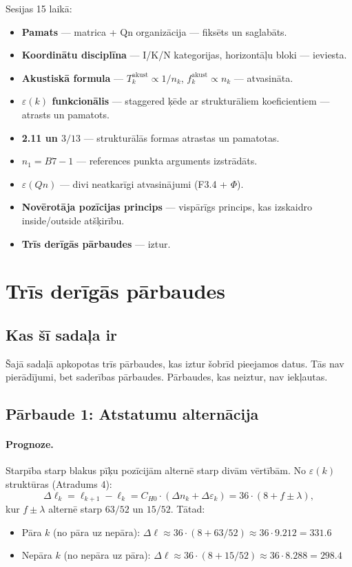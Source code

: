\documentclass[12pt,a4paper]{article}
\begin{document}
Sesijas 15 laikā:
\begin{itemize}
    \item \textbf{Pamats} — matrica + Qn organizācija — fiksēts un saglabāts.
    \item \textbf{Koordinātu disciplīna} — I/K/N kategorijas, horizontāļu bloki — ieviesta.
    \item \textbf{Akustiskā formula} — $T_k^{\text{akust}} \propto 1/n_k$, $f_k^{\text{akust}} \propto n_k$ — atvasināta.
    \item \textbf{$\varepsilon(k)$ funkcionālis} — staggered ķēde ar strukturāliem koeficientiem — atrasts un pamatots.
    \item \textbf{2.11 un $3/13$} — strukturālās formas atrastas un pamatotas.
    \item \textbf{$n_1 = B7-1$} — references punkta arguments izstrādāts.
    \item \textbf{$\varepsilon(Qn)$} — divi neatkarīgi atvasinājumi (F3.4 + $\Phi$).
    \item \textbf{Novērotāja pozīcijas princips} — vispārīgs princips, kas izskaidro inside/outside atšķirību.
    \item \textbf{Trīs derīgās pārbaudes} — iztur.
\end{itemize}

\newpage

\section{Trīs derīgās pārbaudes}
\label{sec:parbaudes}

\subsection*{Kas šī sadaļa ir}

Šajā sadaļā apkopotas trīs pārbaudes, kas iztur šobrīd pieejamos datus. Tās nav pierādījumi, bet saderības pārbaudes. Pārbaudes, kas neiztur, nav iekļautas.

\subsection*{Pārbaude 1: Atstatumu alternācija}

\paragraph{Prognoze.}
Starpība starp blakus pīķu pozīcijām alternē starp divām vērtībām. No $\varepsilon(k)$ struktūras (Atradums 4):
\[
\Delta\ell_k = \ell_{k+1} - \ell_k = C_{H0} \cdot (\Delta n_k + \Delta\varepsilon_k) = 36 \cdot (8 + f \pm \lambda),
\]
kur $f \pm \lambda$ alternē starp $63/52$ un $15/52$. Tātad:
\begin{itemize}
    \item Pāra $k$ (no pāra uz nepāra): $\Delta\ell \approx 36 \cdot (8 + 63/52) \approx 36 \cdot 9.212 = 331.6$
    \item Nepāra $k$ (no nepāra uz pāra): $\Delta\ell \approx 36 \cdot (8 + 15/52) \approx 36 \cdot 8.288 = 298.4$
\end{itemize}
\end{document}
